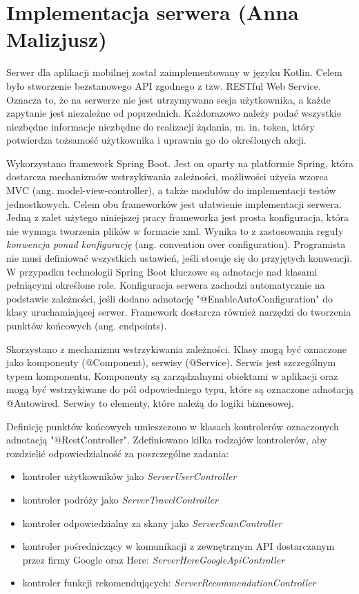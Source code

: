 \documentclass[10pt,twoside,a4paper]{report}
\begin{document}
\section{Implementacja serwera (Anna Malizjusz)}
\par Serwer dla aplikacji mobilnej został zaimplementowany w języku Kotlin. Celem było stworzenie bezstanowego API zgodnego z tzw. RESTful Web Service. Oznacza to, że na serwerze nie jest utrzymywana sesja użytkownika, a każde zapytanie jest niezależne od poprzednich. Każdorazowo należy podać wszystkie niezbędne informacje niezbędne do realizacji żądania, m. in. token, który potwierdza tożsamość użytkownika i uprawnia go do określonych akcji.
\par Wykorzystano framework Spring Boot\cite{Spring documentation}. Jest on oparty na platformie Spring, która dostarcza mechanizmów wstrzykiwania zależności, możliwości użycia wzorca MVC (ang. model-view-controller), a także modułów do implementacji testów jednostkowych. Celem obu frameworków jest ułatwienie implementacji serwera. Jedną z zalet użytego niniejszej pracy frameworka jest prosta konfiguracja, która nie wymaga tworzenia plików w formacie xml. Wynika to z zastosowania reguły \textit{konwencja ponad konfigurację} (ang. convention over configuration). Programista nie musi definiować wszystkich ustawień, jeśli stosuje się do przyjętych konwencji. W przypadku technologii Spring Boot kluczowe są adnotacje nad klasami pełniącymi określone role. 
Konfiguracja serwera zachodzi automatycznie na podstawie zależności, jeśli dodano adnotację "@EnableAutoConfiguration" do klasy uruchamiającej serwer. Framework dostarcza również narzędzi do tworzenia punktów końcowych (ang. endpoints).

\par Skorzystano z mechanizmu wstrzykiwania zależności. Klasy mogą być oznaczone jako komponenty (@Component), serwisy (@Service). Serwis jest szczególnym typem komponentu. Komponenty są zarządzalnymi obiektami w aplikacji oraz mogą być wstrzykiwane do pól odpowiedniego typu, które są oznaczone adnotacją @Autowired. Serwisy to elementy, które należą do logiki biznesowej.
 
\par Definicję punktów końcowych umieszczono w klasach kontrolerów oznaczonych adnotacją "@RestController". Zdefiniowano kilka rodzajów kontrolerów, aby rozdzielić odpowiedzialność za poszczególne zadania:
\begin{itemize}
\item kontroler użytkowników jako \textit{ServerUserController}
\item kontroler podróży jako \textit{ServerTravelController}
\item kontroler odpowiedzialny za skany jako \textit{ServerScanController}
\item kontroler pośredniczący w komunikacji z zewnętrznym API dostarczanym przez firmy Google oraz Here: \textit{ServerHereGoogleApiController}
\item kontroler funkcji rekomendujących: \textit{ServerRecommendationController}
\end{itemize}
\end{document}
